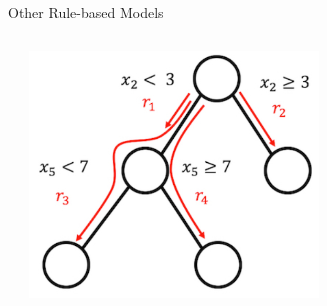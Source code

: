 \documentclass[11pt,compress,t,notes=noshow, aspectratio=169, xcolor=table]{beamer}
\begin{document}
\begin{frame}[c]{Other Rule-based Models}
\begin{columns}[c, totalwidth=\textwidth]
\begin{column}{0.6\textwidth}
    \end{column}
    \begin{column}{0.4\textwidth}
    \vspace{\dimexpr-2\parsep-2\parskip\relax}
        \begin{center}
            \includegraphics[width = 0.6\textwidth]{figure/RuleFit.png} 
        \end{center}
    \end{column}
\end{columns}

\medskip


\end{frame}
\end{document}
